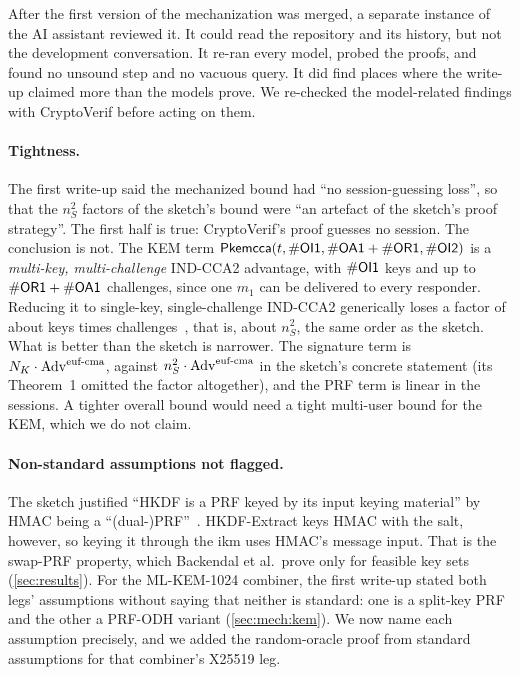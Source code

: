After the first version of the mechanization was merged, a separate instance
of the AI assistant reviewed it. It could read the repository and its
history, but not the development conversation. It re-ran every model,
probed the proofs, and found no unsound step and no vacuous query. It did
find places where the write-up claimed more than the models prove. We
re-checked the model-related findings with CryptoVerif before acting on
them.

\paragraph{Tightness.} The first write-up said the mechanized bound had ``no
session-guessing loss'', so that the $n_S^2$ factors of the sketch's bound
were ``an artefact of the sketch's proof strategy''. The first half is true:
CryptoVerif's proof guesses no session. The conclusion is not. The KEM term
$\mathsf{Pkemcca}(t, \#\mathsf{OI1}, \#\mathsf{OA1}+\#\mathsf{OR1}, \#\mathsf{OI2})$ is a
\emph{multi-key, multi-challenge} IND-CCA2 advantage, with $\#\mathsf{OI1}$
keys and up to $\#\mathsf{OR1} + \#\mathsf{OA1}$ challenges, since one $m_1$ can
be delivered to every responder. Reducing it to single-key, single-challenge
IND-CCA2 generically loses a factor of about keys times
challenges~\cite{BBM00}, that is, about $n_S^2$, the same order as the
sketch. What is better than the sketch is narrower. The signature term is
$N_K \cdot \mathrm{Adv}^{\text{euf-cma}}$, against $n_S^2 \cdot \mathrm{Adv}^{\text{euf-cma}}$
in the sketch's concrete statement (its Theorem~1 omitted the factor
altogether), and the PRF term is linear in the sessions. A tighter overall bound would
need a tight multi-user bound for the KEM, which we do not claim.

\paragraph{Non-standard assumptions not flagged.} The sketch justified ``HKDF
is a PRF keyed by its input keying material'' by HMAC being a
``(dual-)PRF''~\cite{Kra10}. HKDF-Extract keys HMAC with the salt, however,
so keying it through the ikm uses HMAC's message input. That is the swap-PRF
property, which Backendal et al.\ prove only for feasible key
sets~\cite{BBGS23} (\cref{sec:results}). For the ML-KEM-1024 combiner, the
first write-up stated both legs' assumptions without saying that neither is
standard: one is a split-key PRF and the other a PRF-ODH variant
(\cref{sec:mech:kem}). We now name each assumption precisely, and we added
the random-oracle proof from standard assumptions for that combiner's
X25519 leg.

